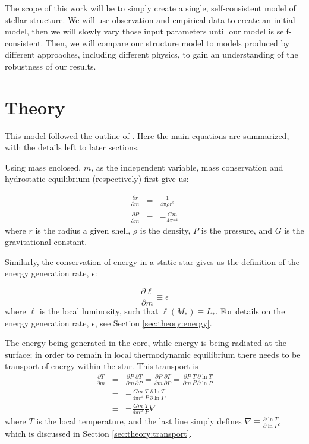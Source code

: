 The scope of this work will be to simply create a single, self-consistent model of stellar structure.  We will use observation and empirical data to create an initial model, then we will slowly vary those input parameters until our model is self-consistent. Then, we will compare our structure model to models produced by different approaches, including different physics, to gain an understanding of the robustness of our results.


\section{Theory}
\label{sec:theory}
This model followed the outline of \citet[Chapter 10]{KippenhahnWeigertWeiss}.  Here the main equations are summarized, with the details left to later sections.

Using mass enclosed, $m$, as the independent variable, mass conservation and hydrostatic equilibrium (respectively) first give us:

\begin{eqnarray}
  \frac{\partial r}{\partial m} &=& \frac{1}{4 \pi \rho r^2} 
   \label{eq:drdm} \\
  \frac{\partial P}{\partial m} &=& - \frac{G m}{4 \pi r^4}
   \label{eq:dPdm}
\end{eqnarray}
where $r$ is the radius a given shell, $\rho$ is the density, $P$ is the pressure, and $G$ is the gravitational constant.

Similarly, the conservation of energy in a static star gives us the definition of the energy generation rate, $\epsilon$:

\begin{equation}
  \frac{\partial \ell}{\partial m} \equiv \epsilon
   \label{eq:dldm}
\end{equation}
where $\ell$ is the local luminosity, such that $\ell\left(M_\ast\right) \equiv L_\ast$.
For details on the energy generation rate, $\epsilon$, see Section \ref{sec:theory:energy}.

The energy being generated in the core, while energy is being radiated at the surface; in order to remain in local thermodynamic equilibrium there needs to be transport of energy within the star.  This transport is 
\begin{eqnarray}
  \frac{\partial T}{\partial m} &=& \frac{\partial P}{\partial m} \frac{\partial T}{\partial P} = \frac{\partial P}{\partial m} \frac{\partial T}{\partial P}  = \frac{\partial P}{\partial m}\frac{T}{P} \frac{ \partial\ln T}{ \partial \ln P} \nonumber \\
  &=& - \frac{G m}{4 \pi r^4} \frac{T}{P} \frac{ \partial\ln T}{ \partial \ln P} \nonumber \\
  &\equiv& - \frac{G m}{4 \pi r^4} \frac{T}{P} \nabla 
   \label{eq:dTdm}
\end{eqnarray}
where $T$ is the local temperature, and the last line simply defines $\nabla \equiv \frac{\partial \ln T}{\partial \ln P}$, which is discussed in Section \ref{sec:theory:transport}.

